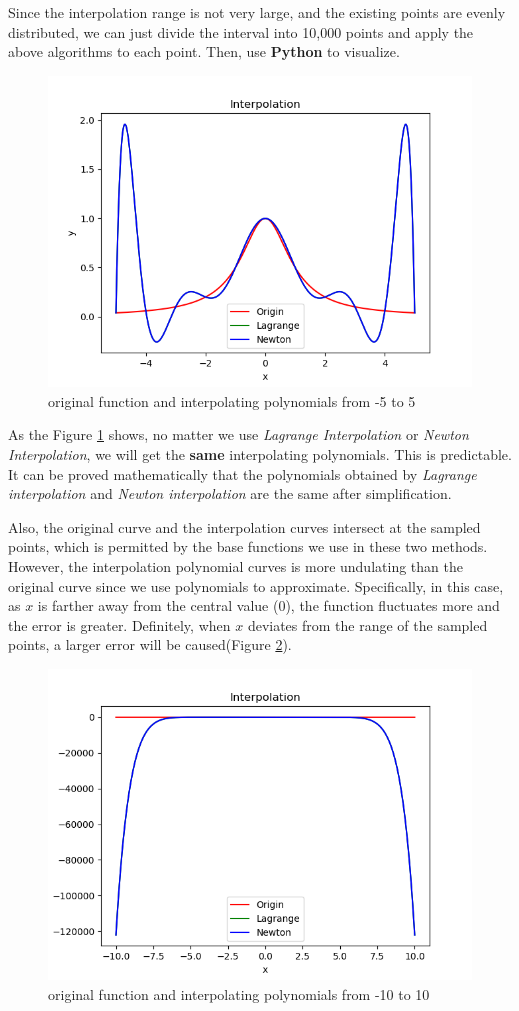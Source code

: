 \documentclass[a4paper]{article}
\begin{document}
Since the interpolation range is not very large, and the existing points are evenly distributed, we can just divide the interval into 10,000 points and apply the above algorithms to each point. Then, use \textbf{Python} to visualize.

\begin{figure}[!h]
    \centering
    \includegraphics[width=.6\textwidth]{./figures/Figure_1.png}
    \caption{original function and interpolating polynomials from -5 to 5}
    \label{fig:Figure_1}
\end{figure}
As the Figure \ref{fig:Figure_1} shows, no matter we use \emph{Lagrange Interpolation} or \emph{Newton Interpolation}, we will get the \textbf{same} interpolating polynomials.
This is predictable.
It can be proved mathematically that the polynomials obtained by \emph{Lagrange interpolation} and \emph{Newton interpolation} are the same after simplification.

Also, the original curve and the interpolation curves intersect at the sampled points, which is permitted by the base functions we use in these two methods.
However, the interpolation polynomial curves is more undulating than the original curve since we use polynomials to approximate.
Specifically, in this case, as $x$ is farther away from the central value (0), the function fluctuates more and the error is greater.
Definitely, when $x$ deviates from the range of the sampled points, a larger error will be caused(Figure \ref{fig:Figure_2}).
\begin{figure}[!h]
    \centering
    \includegraphics[width=.6\textwidth]{./figures/Figure_2.png}
    \caption{original function and interpolating polynomials from -10 to 10}
    \label{fig:Figure_2}
\end{figure}
\end{document}
